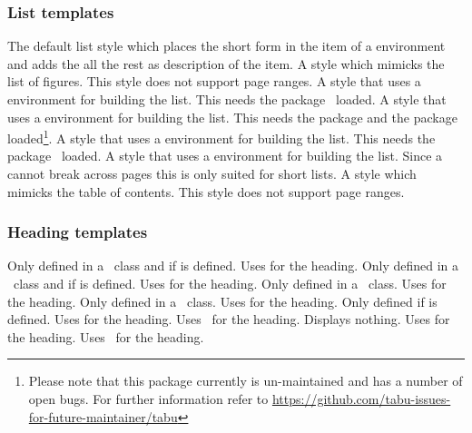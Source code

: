 \documentclass{acro-manual}
\begin{document}
\subsubsection{List templates}
\begin{templates}
    The default list style which places the short form in the item of a
     environment and adds the all the rest as description of
    the item.
    A style which mimicks the list of figures.  This style does not support
    page ranges.
    A style that uses a  environment for building the list.
    This needs the  package~\cite{pkg:longtable} loaded.
    A style that uses a  environment for building the
    list. This needs the  package and the 
    package~\cite{pkg:tabu} loaded\footnote{Please note that this package
      currently is un-maintained and has a number of open bugs. For further
      information refer to
      \url{https://github.com/tabu-issues-for-future-maintainer/tabu}}.
    A style that uses a  environment for
    building the list.  This needs the 
    package~\cite{pkg:supertabular} loaded.
    A style that uses a  environment for building the list.
    Since a  cannot break across pages this is only suited for
    short lists.
    A style which mimicks the table of contents.  This style does not support
    page ranges.
\end{templates}

\subsubsection{Heading templates}
\begin{templates}
    Only defined in a \KOMAScript\ class and if  is defined. Uses
     for the heading.
    Only defined in a \KOMAScript\ class and if  is defined. Uses
     for the heading.
    Only defined in a \KOMAScript\ class. Uses  for the heading.
    Only defined in a \KOMAScript\ class. Uses  for the heading.
    Only defined if  is defined. Uses  for the heading.
    Uses \sarg\ for the heading.
    Displays nothing.
    Uses  for the heading.
    Uses \sarg\ for the heading.
\end{templates}
\end{document}
